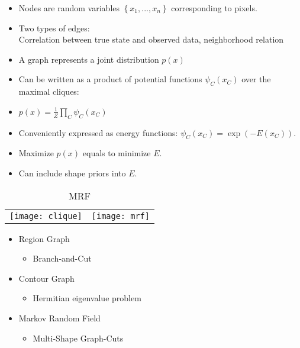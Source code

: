 \documentclass[11pt, a4paper, landscape]{article}
\begin{document}
\NewPage{}
\small
\vfill
\begin{itemize}
\item Nodes are random variables $\left\lbrace x_1, ..., x_n \right\rbrace $ corresponding to pixels.
\item Two types of edges:\\
Correlation between true state and observed data, neighborhood relation
\item A graph represents a joint distribution $p(x)$
\item Can be written as a product of potential functions $\psi_C(x_C)$ over the maximal cliques:
\item[]
	\begin{center}
		$p(x) = \frac{1}{Z} \prod\limits_{C}\psi_C(x_C)$
	\end{center}
\item Conveniently expressed as energy functions: $\psi_C(x_C) = \exp(-E(x_C))$.
\item Maximize $p(x)$ equals to minimize $E$.
\item Can include shape priors into $E$.
\end{itemize}
\begin{table}
  \centering
  \begin{tabular}{@{} M{.5\linewidth} M{.5\linewidth} @{}}
      \texttt{[image: clique]}%
      \caption{Cliques}%
      &
      \texttt{[image: mrf]}%
      \caption{MRF}%
  \end{tabular}
\end{table}
\vfill


\NewPage{}
\vfill
\begin{itemize}
\item Region Graph
\begin{itemize}
\item Branch-and-Cut
\end{itemize}
\vfill
\item Contour Graph
\begin{itemize}
\item Hermitian eigenvalue problem
\end{itemize}
\vfill
\item Markov Random Field
\begin{itemize}
\item Multi-Shape Graph-Cuts
\end{itemize}
\end{itemize}
\vfill
\end{document}
